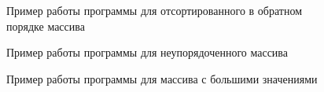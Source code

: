 \documentclass[a4paper,12pt]{article}
\begin{document}
            \begin{figure}[h!]
                \caption{Пример работы программы для отсортированного в обратном порядке массива}
                \label{fig:image_test_3}
            \end{figure}
            
               \begin{figure}[h!]
                \caption{Пример работы программы для неупорядоченного массива}
                \label{fig:image_test_4}
            \end{figure}
            
            \begin{figure}[h!]
                \caption{Пример работы программы для массива с большими значениями}
                \label{fig:image_test_5}
            \end{figure}
\end{document}
